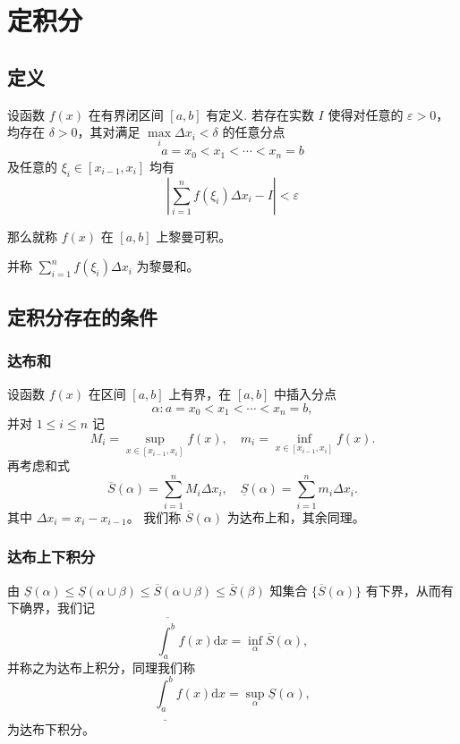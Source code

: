 \chapter{定积分}
	\section{定义}
		设函数 $f(x)$ 在有界闭区间 $[a,b]$ 有定义. 若存在实数 $I$ 使得对任意的 $\varepsilon>0$，均存在 $\delta>0$，其对满足 $\max\limits_{i}\Delta x_i <\delta$ 的任意分点 
		$$a=x_0<x_1<\cdots<x_n=b$$
		及任意的 $\xi_i\in[x_{i-1},x_i]$ 均有
		$$\left|\sum\limits_{i=1}^nf(\xi_i)\Delta x_i - I\right|<\varepsilon$$
		
		那么就称 $f(x)$ 在 $[a,b]$ 上黎曼可积。
		
		并称 $\sum\limits_{i=1}^n f(\xi_i)\Delta x_i$ 为黎曼和。
		
	\section{定积分存在的条件}
		\subsection{达布和}
			设函数 $f(x)$ 在区间 $[a,b]$ 上有界，在 $[a,b]$ 中插入分点 $$\alpha : a=x_0<x_1<\cdots<x_n=b,$$ 并对 $1 \le i \le n$ 记
			$$M_i=\sup\limits_{x\in[x_{i-1},x_i]} f(x), \quad m_i=\inf\limits_{x\in[x_{i-1},x_i]}f(x).$$
			再考虑和式
			$$\overline{S}(\alpha)=\sum\limits_{i=1}^n M_i \Delta x_i, \quad \underline{S}(\alpha)=\sum\limits_{i=1}^n m_i \Delta x_i.$$
			其中 $\Delta x_i=x_i-x_{i-1}$。 我们称 $\overline{S}(\alpha)$ 为达布上和，其余同理。
			
		\subsection{达布上下积分}
			由 $\underline{S}(\alpha)\le \underline{S}(\alpha \cup \beta) \le \overline{S}(\alpha \cup \beta) \le \overline{S}(\beta)$
			知集合 $\{\overline{S}(\alpha)\}$ 有下界，从而有下确界，我们记 
			$$\overline{\int_a^b} f(x)\text{d} x = \inf\limits_{\alpha} \overline{S}(\alpha),$$
			 并称之为达布上积分，同理我们称
			 $$\underline{\int_a^b} f(x)\text{d} x = \sup\limits_{\alpha} \underline{S}(\alpha),$$
			 为达布下积分。
			 
